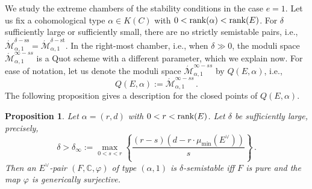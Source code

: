 \documentclass[11pt]{amsart}
\newtheorem{proposition}[theorem]{Proposition}
\theoremstyle{remark}
\newcommand{\C}{\mathbb{C}}
\newcommand{\Mdash}{\acute{\mathcal{M}}}
\newcommand{\rk}{\textnormal{rank}}
\newcommand{\vp}[0]{\varphi}
\renewcommand{\ss}[0]{\text{ss}}
\newcommand{\st}[0]{\text{st}}
\numberwithin{theorem}{section}
\begin{document}
    We study the extreme chambers of the stability conditions
    in the case $e =1$.
    Let us fix a cohomological type $\alpha \in K(C)$ with $0<\rk(\alpha)<\rk(E)$.
    For $\delta$ sufficiently large or sufficiently small, there are no strictly semistable pairs, 
    i.e., $\Mdash^{\delta-\ss}_{\alpha,1} = \Mdash^{\delta-\st}_{\alpha,1}$.
    In the right-most chamber, i.e., when $\delta \gg 0$,
    the moduli space $\Mdash^{\infty-ss}_{\alpha,1}$ is a Quot scheme with a different parameter,
    which we explain now.
    For ease of notation, let us denote the moduli space
    $\Mdash^{\infty-ss}_{\alpha,1}$ by $Q(E,\alpha)$, i.e.,
    $$Q(E,\alpha):= \Mdash^{\infty-ss}_{\alpha,1}\,.$$
    The following proposition gives a description for the closed points of $Q(E,\alpha)$.
    \begin{proposition}\label{proposition stability and gg}
    Let $\alpha = (r,d)$ with $0<r<\rk(E)$. 
        Let $\delta$ be sufficiently large, precisely, 
        $$\delta > \delta_{\infty} := \max_{0<s<r}
        \left\{ \frac{(r-s)(d-r \cdot \mu_{\min}(E^\vee))}{s}
        \right\}\,.
        $$
        Then an $E^\vee$-pair $(F,\C,\vp)$ of type $(\alpha,1)$ is $\delta$-semistable iff 
        $F$ is pure and
        the map $\vp$ is generically surjective.
    \end{proposition}
\end{document}
